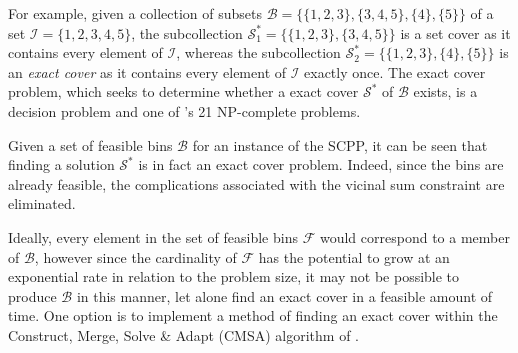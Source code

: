 \documentclass[a4paper,11pt,authoryear]{elsarticle}
\begin{document}
\noindent For example, given a collection of subsets $\mathcal{B} = \{\{1,2,3\}, \{3,4,5\}, \{4\}, \{5\}\}$ of a set $\mathcal{I} = \{1,2,3,4,5\}$, the subcollection $\mathcal{S}^*_1 = \{\{1,2,3\}, \{3,4,5\}\}$ is a set cover as it contains every element of $\mathcal{I}$, whereas the subcollection $\mathcal{S}^*_2 = \{\{1,2,3\}, \{4\}, \{5\}\}$ is an \emph{exact cover} as it contains every element of $\mathcal{I}$ exactly once. The exact cover problem, which seeks to determine whether a exact cover $\mathcal{S}^*$ of $\mathcal{B}$ exists, is a decision problem and one of \citeauthor{karp1972}'s 21 NP-complete problems.

Given a set of feasible bins $\mathcal{B}$ for an instance of the SCPP, it can be seen that finding a solution $\mathcal{S}^*$ is in fact an exact cover problem. Indeed, since the bins are already feasible, the complications associated with the vicinal sum constraint are eliminated.

Ideally, every element in the set of feasible bins $\mathcal{F}$ would correspond to a member of $\mathcal{B}$, however since the cardinality of $\mathcal{F}$ has the potential to grow at an exponential rate in relation to the problem size, it may not be possible to produce $\mathcal{B}$ in this manner, let alone find an exact cover in a feasible amount of time. One option is to implement a method of finding an exact cover within the Construct, Merge, Solve \& Adapt (CMSA) algorithm of \cite{blum2016}. 

\end{document}

